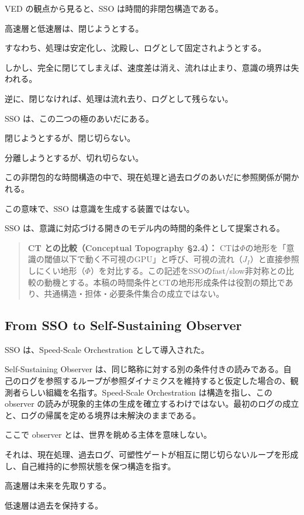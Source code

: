 VED の観点から見ると、SSO は時間的非閉包構造である。

高速層と低速層は、閉じようとする。

すなわち、処理は安定化し、沈殿し、ログとして固定されようとする。

しかし、完全に閉じてしまえば、速度差は消え、流れは止まり、意識の境界は失われる。

逆に、閉じなければ、処理は流れ去り、ログとして残らない。

SSO は、この二つの極のあいだにある。

閉じようとするが、閉じ切らない。

分離しようとするが、切れ切らない。

この非閉包的な時間構造の中で、現在処理と過去ログのあいだに参照関係が開かれる。

この意味で、SSO は意識を生成する装置ではない。

SSO は、意識に対応づける開きのモデル内の時間的条件として提案される。

\begin{quote}
\textbf{CT との比較（Conceptual Topography §2.4）：} CTは$\Phi$の地形を「意識の閾値以下で動く不可視のGPU」と呼び、可視の流れ（$J_I$）と直接参照しにくい地形（$\Phi$）を対比する。この記述をSSOのfast/slow非対称との比較の動機とする。本稿の時間条件とCTの地形形成条件は役割の類比であり、共通構造・担体・必要条件集合の成立ではない。
\end{quote}

\subsection{From SSO to Self-Sustaining Observer}

SSO は、Speed-Scale Orchestration として導入された。

Self-Sustaining Observer は、同じ略称に対する別の条件付きの読みである。自己のログを参照するループが参照ダイナミクスを維持すると仮定した場合の、観測者らしい組織を名指す。Speed-Scale Orchestration は構造を指し、この observer の読みが現象的主体の生成を確立するわけではない。最初のログの成立と、ログの帰属を定める境界は未解決のままである。

ここで observer とは、世界を眺める主体を意味しない。

それは、現在処理、過去ログ、可塑性ゲートが相互に閉じ切らないループを形成し、自己維持的に参照状態を保つ構造を指す。

高速層は未来を先取りする。

低速層は過去を保持する。

